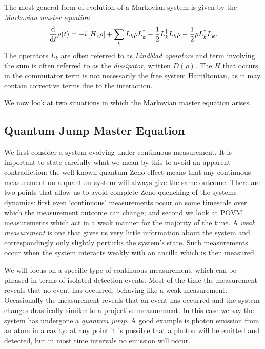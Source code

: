 The most general form \cite{lindblad} of evolution of a Markovian system is given by the \textit{Markovian master equation}
\begin{align}\label{master_eq}
  \frac{\mathrm{d}}{\mathrm{d}t} \rho(t) = -i \left[H, \rho\right] + \sum_k L_k \rho L_k^\dagger -\frac{1}{2} L_k^\dagger L_k \rho -\frac{1}{2} \rho L_k^\dagger L_k .
\end{align}
The operators $L_k$ are often referred to as \textit{Lindblad operators} and term involving the sum is often referred to as the \textit{dissipator}, written $D(\rho)$. The $H$ that occurs in the commutator term is not necessarily the free system Hamiltonian, as it may contain corrective terms due to the interaction.

We now look at two situations in which the Markovian master equation arises.

\subsection{Quantum Jump Master Equation}

We first consider a system evolving under continuous measurement. It is important to state carefully what we mean by this to avoid an apparent contradiction: the well known quantum Zeno effect means that any continuous measurement on a quantum system will always give the same outcome. There are two points that allow us to avoid complete Zeno quenching of the systems dynamics: first even `continuous' measurements occur on some timescale over which the measurement outcome can change; and second we look at POVM measurements which act in a weak manner for the majority of the time. A \textit{weak measurement} is one that gives us very little information about the system and correspondingly only slightly perturbs the system's state. Such measurements occur when the system interacts weakly with an ancilla which is then measured.

We will focus on a specific type of continuous measurement, which can be phrased in terms of isolated detection events. Most of the time the measurement reveals that no event has occurred, behaving like a weak measurement. Occasionally the measurement reveals that an event has occurred and the system changes drastically similar to a projective measurement. In this case we say the system has undergone a \textit{quantum jump}. A good example is photon emission from an atom in a cavity: at any point it is possible that a photon will be emitted and detected, but in most time intervals no emission will occur.

